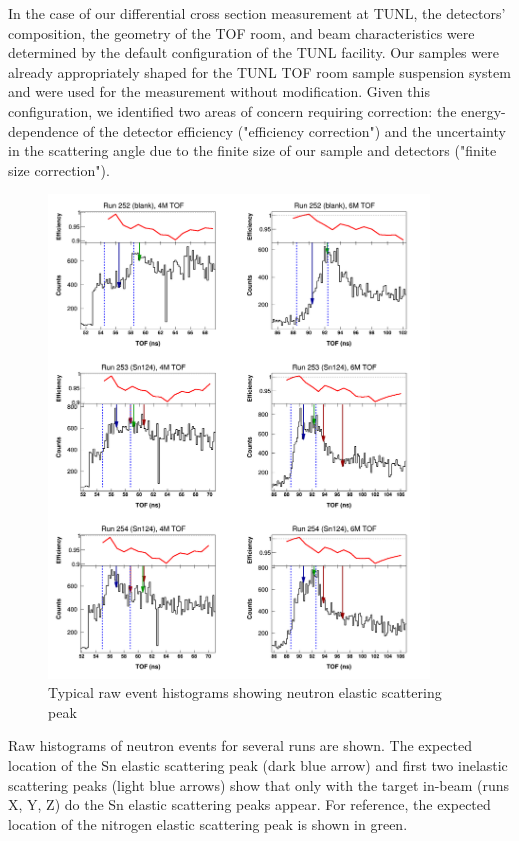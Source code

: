 In the case of our differential cross section measurement at TUNL, the detectors'
composition, the geometry of the TOF room, and beam characteristics were
determined by the default configuration of the TUNL facility. Our samples were already
appropriately shaped for the TUNL TOF room sample suspension system and were
used for the measurement without modification. Given this configuration, we
identified two areas of concern requiring correction: the energy-dependence of
the detector efficiency ("efficiency correction") and the uncertainty in the
scattering angle due to the finite size of our sample and detectors ("finite
size correction").

\begin{figure}
    \includegraphics[width = 0.9\textwidth]{figures/tiledRunData.png}
    \caption{Typical raw event histograms showing neutron elastic scattering peak} \label{tiledRunData}
\end{figure}

Raw histograms of neutron events for several runs are shown. The
        expected location of the Sn elastic scattering peak (dark blue arrow)
        and first two inelastic scattering peaks (light blue arrows) show that
        only with the target in-beam (runs X, Y, Z) do the Sn elastic scattering
        peaks appear. For reference, the expected location of the nitrogen elastic scattering
    peak is shown in green.

